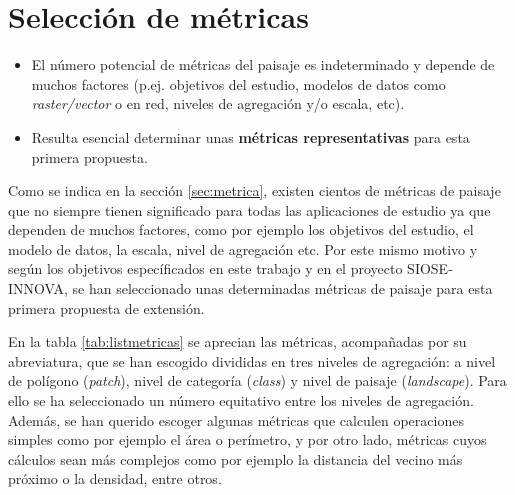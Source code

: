 \section{Selección de métricas}

\begin{graybox}
\begin{itemize}
\item El número potencial de métricas del paisaje es indeterminado y depende de muchos factores (p.ej. objetivos del estudio, modelos de datos como \textit{raster/vector} o en red, niveles de agregación y/o escala, etc).
\item Resulta esencial determinar unas \textbf{métricas representativas} para esta primera propuesta.
\end{itemize}
\end{graybox}

Como se indica en la sección \ref{sec:metrica}, existen cientos de métricas de paisaje que no siempre tienen significado para todas las aplicaciones de estudio ya que dependen de muchos factores, como por ejemplo los objetivos del estudio, el modelo de datos, la escala, nivel de agregación etc. Por este mismo motivo y según los objetivos específicados en este trabajo y en el proyecto SIOSE-INNOVA, se han seleccionado unas determinadas métricas de paisaje para esta primera propuesta de extensión.

En la tabla \ref{tab:listmetricas} se aprecian las métricas, acompañadas por su abreviatura, que se han escogido divididas en tres niveles de agregación: a nivel de polígono (\textit{patch}), nivel de categoría (\textit{class}) y nivel de paisaje (\textit{landscape}). Para ello se ha seleccionado un número equitativo entre los niveles de agregación. Además, se han querido escoger algunas métricas que calculen operaciones simples como por ejemplo el área o perímetro, y por otro lado, métricas cuyos cálculos sean más complejos como por ejemplo la distancia del vecino más próximo o la densidad, entre otros.


